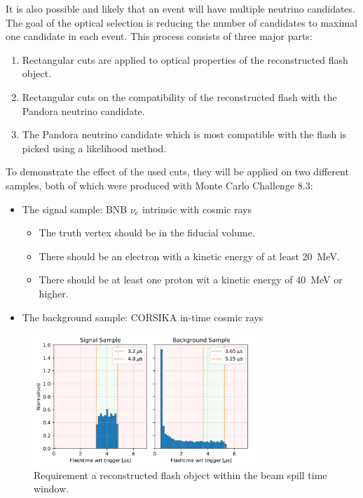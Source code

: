 \documentclass[a4paper]{article}
\begin{document}
It is also possible and likely that an event will have multiple neutrino candidates. The goal of the optical selection is reducing the number of candidates to maximal one candidate in each event. This process consists of three major parts:
\begin{enumerate}
\item Rectangular cuts are applied to optical properties of the reconstructed flash object.
\item Rectangular cuts on the compatibility of the reconstructed flash with the Pandora neutrino candidate.
\item The Pandora neutrino candidate which is most compatible with the flash is picked using a likelihood method.
\end{enumerate}

To demonstrate the effect of the used cuts, they will be applied on two different samples, both of which were produced with Monte Carlo Challenge 8.3:
\begin{itemize}
\item The signal sample: BNB $\nu_e$ intrinsic with cosmic rays
\begin{itemize}
\item The truth vertex should be in the fiducial volume.
\item There should be an electron with a kinetic energy of at least \SI{20}{\MeV}.
\item There should be at least one proton wit a kinetic energy of \SI{40}{\MeV} or higher.
\end{itemize}
\item The background sample: CORSIKA in-time cosmic rays
\end{itemize}

\begin{figure}[!htbp]
\centering
\includegraphics[width=0.75\textwidth]{beam}
\caption{Requirement a reconstructed flash object within the beam spill time window.} 
\label{fig:beam}
\end{figure}
\end{document}
